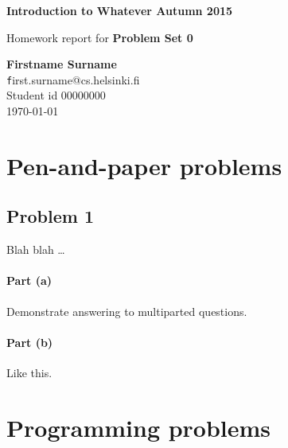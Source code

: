 \documentclass[12pt]{article}
\makeatletter
\newcommand{\Student}{Firstname Surname}
\newcommand{\StudentId}{00000000}
\newcommand{\Email}{first.surname@cs.helsinki.fi}
\newcommand{\CourseName}{Introduction to Whatever \hfill Autumn 2015}
\newcommand{\ProblemSet}{Problem Set 0}
\makeatother
\begin{document}

    \noindent
    {\bf \CourseName}

    \noindent
    Homework report for
    {\bf \ProblemSet}

    \bigskip

    {\raggedright
        {\bf \Student} \\
        {\texttt \Email } \\
        Student id \StudentId \\
        \today
    }


    \tableofcontents

    \newpage


    \section{Pen-and-paper problems}
    \label{sec:pen_and_paper_problems}


    \subsection{Problem 1}
    \label{sub:problem_1}

    Blah blah \dots

    \paragraph{Part (a)}
    Demonstrate answering to multiparted questions.

    \paragraph{Part (b)}
    Like this.

    \section{Programming problems}
    \label{sec:programming_problems}
\end{document}
